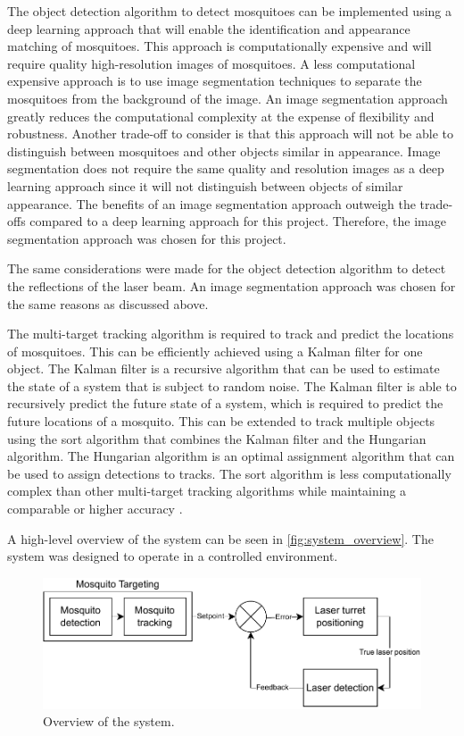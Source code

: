 The object detection algorithm to detect mosquitoes can be implemented using a deep learning approach that will enable the identification and appearance matching of mosquitoes. This approach is computationally expensive and will require quality high-resolution images of mosquitoes. A less computational expensive approach is to use image segmentation techniques to separate the mosquitoes from the background of the image. An image segmentation approach greatly reduces the computational complexity at the expense of flexibility and robustness. Another trade-off to consider is that this approach will not be able to distinguish between mosquitoes and other objects similar in appearance. Image segmentation does not require the same quality and resolution images as a deep learning approach since it will not distinguish between objects of similar appearance. The benefits of an image segmentation approach outweigh the trade-offs compared to a deep learning approach for this project. Therefore, the image segmentation approach was chosen for this project.

The same considerations were made for the object detection algorithm to detect the reflections of the laser beam. An image segmentation approach was chosen for the same reasons as discussed above.

The multi-target tracking algorithm is required to track and predict the locations of mosquitoes. This can be efficiently achieved using a Kalman filter for one object. The Kalman filter is a recursive algorithm that can be used to estimate the state of a system that is subject to random noise. The Kalman filter is able to recursively predict the future state of a system, which is required to predict the future locations of a mosquito. This can be extended to track multiple objects using the \gls{sort} algorithm that combines the Kalman filter and the Hungarian algorithm. The Hungarian algorithm is an optimal assignment algorithm that can be used to assign detections to tracks. The \gls{sort} algorithm is less computationally complex than other multi-target tracking algorithms while maintaining a comparable or higher accuracy \cite{SORT-Bewley2017}.

A high-level overview of the system can be seen in \autoref{fig:system_overview}. The system was designed to operate in a controlled environment.
\begin{figure}[h]
  \centering
  \includegraphics[width=1\textwidth]{figures/system_overview.pdf}
  \caption{Overview of the system.}
  \label{fig:system_overview}
\end{figure}

\newpage


